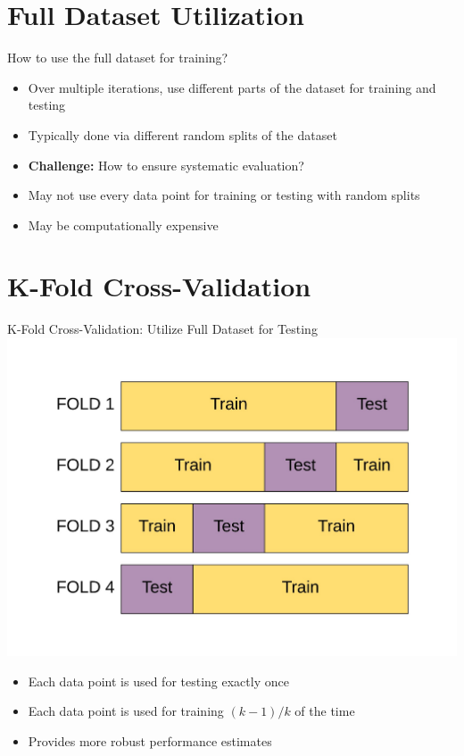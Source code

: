 \documentclass[usenames,dvipsnames]{beamer}
\begin{document}
\section{Full Dataset Utilization}

\begin{frame}{How to use the full dataset for training?}
\begin{itemize}
	\item \pause Over multiple iterations, use different parts of the dataset for training and testing
	\item \pause Typically done via different random splits of the dataset
	\item \pause \textbf{Challenge:} How to ensure systematic evaluation?
	\item \pause May not use every data point for training or testing with random splits
	\item \pause May be computationally expensive
\end{itemize}
\end{frame}

\section{K-Fold Cross-Validation}

\begin{frame}{K-Fold Cross-Validation: Utilize Full Dataset for Testing}
\includegraphics[width = \textwidth]{../assets/cross-validation/diagrams/cross-validation-train-test}
\pause 
\begin{itemize}
	\item Each data point is used for testing exactly once
	\item Each data point is used for training $(k-1)/k$ of the time
	\item Provides more robust performance estimates
\end{itemize}
\end{frame}
\end{document}
